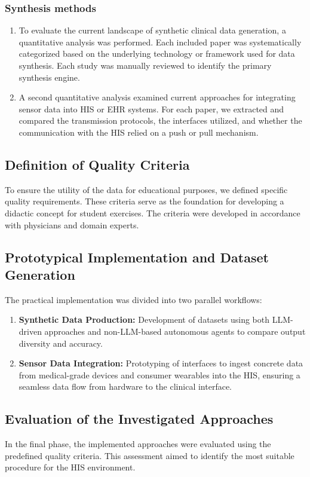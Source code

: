 \subsubsection*{Synthesis methods}
\begin{enumerate}
    \item To evaluate the current landscape of synthetic clinical data generation, a quantitative analysis was performed. Each included paper was systematically categorized based on the underlying technology or framework used for data synthesis.
    Each study was manually reviewed to identify the primary synthesis engine.

    \item A second quantitative analysis examined current approaches for integrating sensor data into HIS or EHR systems. For each paper, we extracted and compared the transmission protocols, the interfaces utilized, and whether the communication with the HIS relied on a push or pull mechanism.
\end{enumerate}


\subsection*{Definition of Quality Criteria}
To ensure the utility of the data for educational purposes, we defined specific quality requirements. These criteria serve as the foundation for developing a didactic concept for student exercises. The criteria were developed in accordance with physicians and domain experts. 

\subsection*{Prototypical Implementation and Dataset Generation}
The practical implementation was divided into two parallel workflows:
\begin{enumerate}
    \item \textbf{Synthetic Data Production:} Development of datasets using both LLM-driven approaches and non-LLM-based autonomous agents to compare output diversity and accuracy.
    \item \textbf{Sensor Data Integration:} Prototyping of interfaces to ingest concrete data from medical-grade devices and consumer wearables into the HIS, ensuring a seamless data flow from hardware to the clinical interface.
\end{enumerate}

\subsection*{Evaluation of the Investigated Approaches}
In the final phase, the implemented approaches were evaluated using the predefined quality criteria. This assessment aimed to identify the most suitable procedure for the HIS environment.







